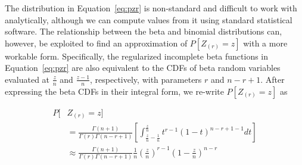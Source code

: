 \documentclass[12pt]{article}
\theoremstyle{plain}
\begin{document}
The distribution in Equation~\eqref{eq:pzr} is non-standard and difficult to work with analytically, although we can compute values from it using standard statistical software. The relationship between the beta and binomial distributions can, however, be exploited to find an approximation of $P\left[ Z_{(r)} = z \right]$ with a more workable form. Specifically, the regularized incomplete beta functions in Equation~\eqref{eq:pzr} are also equivalent to the CDFs of beta random variables evaluated at $\frac{z}{n}$ and $\frac{z-1}{n}$, respectively, with parameters $r$ and $n - r + 1$. After expressing the beta CDFs in their integral form, we re-write $P\left[ Z_{(r)} = z \right]$ as

\begin{align*}
	P\bigg[ &Z_{(r)} = z \bigg] \\
	&=  \frac{\Gamma(n+1)}{\Gamma(r)\Gamma(n - r + 1)} \left[ \int_{\frac{z}{n}-\frac{1}{n}}^{\frac{z}{n}} t^{r-1}\left(1-t\right)^{n-r + 1 - 1} dt \right]\\
	&\approx \frac{\Gamma(n+1)}{\Gamma(r)\Gamma(n - r + 1)}  \frac{1}{n} \left(\frac{z}{n}\right)^{r-1}\left(1-\frac{z}{n}\right)^{n-r}
\end{align*}
\end{document}
